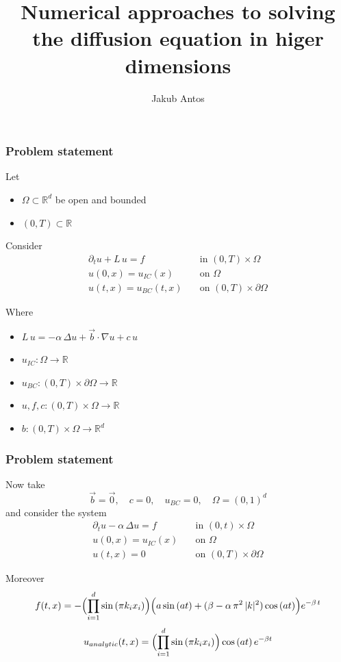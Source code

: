 \documentclass{beamer}
\title{Numerical approaches to solving the diffusion equation in higer dimensions}
\author{Jakub Antos}
\institute{supervisor: Michal Pavelka}
\begin{document}


\frame{\titlepage}

\begin{frame}
\frametitle{Problem statement}

\pause
Let
\begin{itemize}
\item $\Omega \subset \mathbb{R}^d$ be open and bounded
\item $(0, T)\subset\mathbb{R}$
\end{itemize}

\pause
Consider
\begin{align*}
\partial_t u + L\,u = f \quad &\text{in } (0,T)\times\Omega \\
u(0,x) = u_{IC}(x)\quad &\text{on } \Omega \\
u(t,x) = u_{BC}(t,x)\quad &\text{on } (0,T)\times\partial\Omega
\end{align*}

\pause
Where
\begin{itemize}
\item $L\,u = -\alpha\,\Delta u + \vec{b} \cdot \nabla u + c\, u$
\pause
\item $u_{IC}: \Omega \to \mathbb{R}$
\item $u_{BC}: (0,T)\times\partial\Omega \to \mathbb{R}$
\pause
\item $u,f,c: (0,T)\times\Omega \to \mathbb{R}$
\item $b: (0,T)\times\Omega \to \mathbb{R}^d$
\end{itemize}

\end{frame}

\begin{frame}
\frametitle{Problem statement}

Now take
$$ \vec{b}=\vec{0}, \quad c = 0, \quad u_{BC} = 0,\quad \Omega = (0,1)^d $$
\pause
and consider the system
\begin{align*}
\partial_t u - \alpha\,\Delta u = f \quad &\text{in } (0,t)\times\Omega \\
u(0,x) = u_{IC}(x)\quad &\text{on } \Omega \\
u(t,x) = 0\quad &\text{on } (0,T)\times\partial\Omega
\end{align*}

\pause
Moreover
$$
f(t,x) = -\Bigl(\prod_{i=1}^d \sin{(\pi k_i x_i)}\Bigr) 
\Bigl(a\sin{(at)} + (\beta - \alpha\,\pi^2\,|k|^2)\cos{(at)}\Bigr) e^{-\beta\,t}
$$
$$ u_{analytic}(t,x) = \Bigl(\prod_{i=1}^d \sin{(\pi k_i x_i)}\Bigr) \cos{(at)}\,e^{-\beta t} $$

\end{frame}
\end{document}
